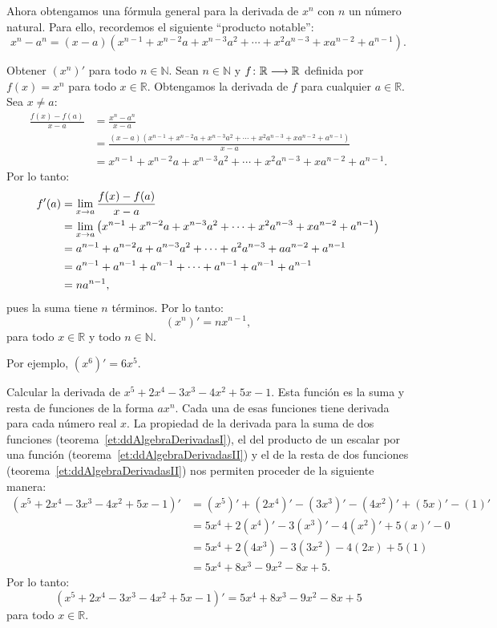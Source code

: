 Ahora obtengamos una fórmula general para la derivada de $x^n$ con $n$ un número natural. Para
ello, recordemos el siguiente ``producto notable'':
\[
x^n - a^n = (x - a)(x^{n-1} + x^{n-2}a + x^{n-3}a^2 + \cdots + x^2a^{n-3} + xa^{n-2} + a^{n-1}).
\]

\begin{exemplo}[Solución]{\label{ej:ddDerivadaPotencia}%
Obtener $(x^n)'$ para todo $n\in\mathbb{N}$.
}%
Sean $n\in\mathbb{N}$ y $\funcjc{f}{\mathbb{R}}{\mathbb{R}}$ definida por $f(x) = x^n$ para todo $x
\in\mathbb{R}$. Obtengamos la derivada de $f$ para cualquier $a\in\mathbb{R}$. Sea $x\neq a$:
\begin{align*}
\frac{f(x) - f(a)}{x - a} &= \frac{x^n - a^n}{x - a} \\[4pt]
  &= \frac{(x - a)(x^{n-1} + x^{n-2}a + x^{n-3}a^2 + \cdots +
    x^2a^{n-3} + xa^{n-2} + a^{n-1})}{x - a}\\[4pt]
  &= x^{n-1} + x^{n-2}a + x^{n-3}a^2 + \cdots + x^2a^{n-3} + xa^{n-2} + a^{n-1}.
\end{align*}
Por lo tanto:
\begin{align*}
f'(a) &= \limjc{\frac{f(x) - f(a)}{x - a}}{x}{a} \\
  &= \limjc{\left(x^{n-1} + x^{n-2}a + x^{n-3}a^2 + \cdots + x^2a^{n-3} + xa^{n-2} + a^{n-1}\right)}{x}{a} \\
  &= a^{n-1} + a^{n-2}a + a^{n-3}a^2 + \cdots + a^2a^{n-3} + aa^{n-2} + a^{n-1} \\
  &= a^{n-1} + a^{n-1} + a^{n-1} + \cdots + a^{n-1} + a^{n-1} + a^{n-1} \\
  &= na^{n-1},
\end{align*}
pues la suma tiene $n$ términos. Por lo tanto:
\[
(x^n)' = nx^{n-1},
\]
para todo $x\in\mathbb{R}$ y todo $n\in\mathbb{N}$.

Por ejemplo, $(x^6)' = 6x^5$.
\end{exemplo}

\begin{exemplo}{%
Calcular la derivada de $x^5 + 2x^4 - 3x^3 - 4x^2 + 5x - 1$.
}%
Esta función es la suma y resta de funciones de la forma $ax^n$. Cada una de esas funciones tiene
derivada para cada número real $x$. La propiedad de la derivada para la suma de dos funciones
(teorema~\ref{et:ddAlgebraDerivadasI}), el del producto de un escalar por una función
(teorema~\ref{et:ddAlgebraDerivadasII}) y el de la resta de dos funciones
(teorema~\ref{et:ddAlgebraDerivadasII}) nos permiten proceder de la siguiente manera:
\begin{align*}
(x^5 + 2x^4 - 3x^3 - 4x^2 + 5x - 1)' &= (x^5)' + (2x^4)' - (3x^3)' - (4x^2)' + (5x)' - (1)'\\
  &= 5x^4 + 2(x^4)' - 3(x^3)' - 4(x^2)' + 5(x)' - 0 \\
  &= 5x^4 + 2(4x^3) - 3(3x^2) - 4(2x) + 5(1) \\
  &= 5x^4 + 8x^3 - 9x^2 - 8x + 5.
\end{align*}
Por lo tanto:
\[
(x^5 + 2x^4 - 3x^3 - 4x^2 + 5x - 1)' = 5x^4 + 8x^3 - 9x^2 - 8x + 5
\]
para todo $x\in\mathbb{R}$.
\end{exemplo}%

